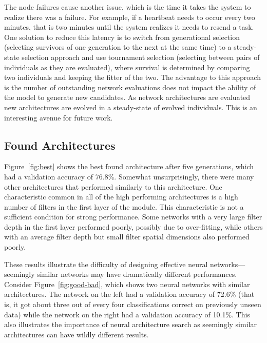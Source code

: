 \documentclass[conference]{IEEEtran}
\begin{document}
The node failures cause another issue, which is the time it takes the system to
realize there was a failure. For example, if a heartbeat needs to occur every two
minutes, that is two minutes until the system realizes it needs to resend a task.
One solution to reduce this latency is to switch from generational selection (selecting survivors
of one generation to the next at the same time) to a steady-state selection
approach and use tournament selection (selecting between pairs of individuals as
they are evaluated), where survival is determined by comparing
two individuals and keeping the fitter of the two. The advantage to this approach
is the number of outstanding network evaluations does not impact the ability of
the model to generate new candidates. As network architectures are evaluated
new architectures are evolved in a steady-state of evolved individuals. This is
an interesting avenue for future work.

\subsection{Found Architectures}
Figure~\ref{fig:best} shows the best found architecture after five generations,
which had a validation accuracy of 76.8\%.
Somewhat unsurprisingly, there were many other architectures that performed
similarly to this architecture. One characteristic common in all of the high
performing architectures is a high number of filters in the first layer of
the module. This characteristic is not a sufficient condition for strong
performance. Some networks with a very large filter depth in the first layer
performed poorly, possibly due to over-fitting, while others with an average
filter depth but small filter spatial dimensions also performed poorly.

These results illustrate the difficulty of designing effective neural
networks---seemingly similar networks may have dramatically different
performances. Consider Figure~\ref{fig:good-bad}, which shows two neural
networks with similar architectures. The network on the left had a validation
accuracy of 72.6\% (that is, it got about three out of every four classifications
correct on previously unseen data) while the network on the right had a
validation accuracy of 10.1\%. This also illustrates the importance of neural
architecture search as seemingly similar architectures can have wildly different
results.
\end{document}
